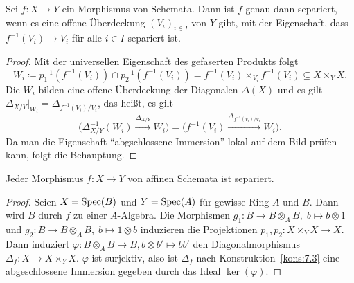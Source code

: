 \begin{lem}
\label{lem:10.2}
	Sei $f \colon X \to Y$ ein Morphismus von Schemata. Dann ist $f$ genau dann separiert, wenn es eine offene Überdeckung $(V_i)_{i\in I}$ von $Y$ gibt, mit der Eigenschaft, dass $f^{-1}(V_i) \to V_i$ für alle $i \in I$ separiert ist.
	\begin{proof}
		Mit der universellen Eigenschaft des gefaserten Produkts folgt
		\[
			W_i \coloneqq p_1^{-1}(f^{-1}(V_i)) \cap p_2^{-1}(f^{-1}(V_i)) = f^{-1}(V_i) \times_{V_i} f^{-1}(V_i) \subseteq X \times_Y X.
		\]
		Die $W_i$ bilden eine offene Überdeckung der Diagonalen $\Delta(X)$ und es gilt $\Delta_{X/Y}\vert_{W_i} = \Delta_{f^{-1}(V_i)/V_i}$, das heißt, es gilt
		\[
			\Bigg(\Delta^{-1}_{X/Y}(W_i) \xrightarrow{\Delta_{X/Y}} W_i\Bigg) = \Bigg(f^{-1}(V_i) \xrightarrow{\Delta_{f^{-1}(V_i)/V_i}} W_i\Bigg).
		\]
		Da man die Eigenschaft \enquote{abgschlossene Immersion} lokal auf dem Bild prüfen kann, folgt die Behauptung. 
	\end{proof}
\end{lem}

\pagebreak[2]
\begin{prop}
\label{prop:10.3}
	Jeder Morphismus $f\colon X \to Y$ von affinen Schemata ist separiert.
	\begin{proof}
		Seien $X=\operatorname{Spec}(B)$ und $Y=\operatorname{Spec}(A)$ für gewisse Ring $A$ und $B$. Dann wird $B$ durch $f$ zu einer $A$-Algebra. Die Morphismen $g_1\colon B \to B \otimes_A B,\; b \mapsto b \otimes 1$ und $g_2\colon B \to B \otimes_A B,\; b \mapsto 1 \otimes b$ induzieren die Projektionen $p_1,p_2 \colon X\times_Y X\to X$. Dann induziert $\varphi\colon B\otimes_A B \to B, b \otimes b' \mapsto bb'$ den Diagonalmorphismus $\Delta_f\colon X \to X \times_Y X$. $\varphi$ ist surjektiv, also ist $\Delta_f$ nach Konstruktion~\ref{kons:7.3} eine abgeschlossene Immersion gegeben durch das Ideal $\ker(\varphi)$.
	\end{proof}
\end{prop}

